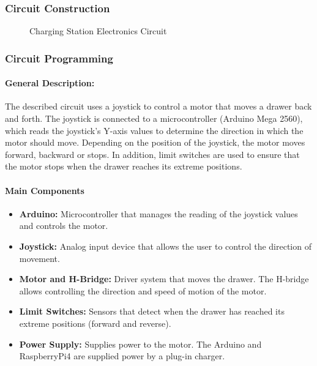     \subsubsection{Circuit Construction}
    \begin{figure}[H]
        \centering
        \caption{Charging Station Electronics Circuit}
        \label{fig:station_electronics_circuit}
    \end{figure}
    
    \subsubsection{Circuit Programming}
    
    \paragraph{\textbf{General Description:}}
    
    
    The described circuit uses a joystick to control a motor that moves a drawer back and forth. The joystick is connected to a microcontroller (Arduino Mega 2560), which reads the joystick's Y-axis values to determine the direction in which the motor should move. Depending on the position of the joystick, the motor moves forward, backward or stops. In addition, limit switches are used to ensure that the motor stops when the drawer reaches its extreme positions.
    
    
    
    \paragraph{\textbf{Main Components}
    }
    \begin{itemize}
        \item \textbf{Arduino:} Microcontroller that manages the reading of the joystick values and controls the motor.
        \item \textbf{Joystick:} Analog input device that allows the user to control the direction of movement.
        \item \textbf{Motor and H-Bridge:} Driver system that moves the drawer. The H-bridge allows controlling the direction and speed of motion of the motor.
        \item \textbf{Limit Switches:} Sensors that detect when the drawer has reached its extreme positions (forward and reverse).
        \item \textbf{Power Supply:} Supplies power to the motor. The Arduino and RaspberryPi4 are supplied power by a plug-in charger.
    \end{itemize}
    
